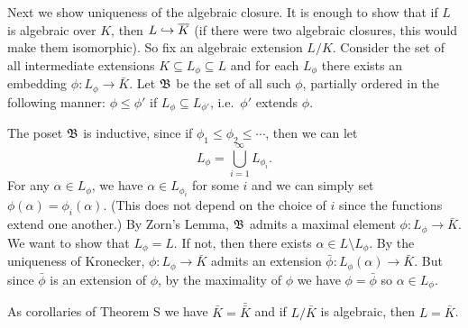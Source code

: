 Next we show uniqueness of the algebraic closure. It is enough to show that if $L$ is algebraic over $K$, then $L\hookrightarrow \overline K$ (if there were two algebraic closures, this would make them isomorphic). So fix an algebraic extension $L/K$. Consider the set of all intermediate extensions $K\subseteq L_\phi\subseteq L$ and for each $L_\phi$ there exists an embedding $\phi : L_\phi \to \bar K$. Let $\frak B$ be the set of all such $\phi$, partially ordered in the following manner: $\phi \leq \phi'$ if $L_\phi \subseteq L_{\phi'}$, i.e.\ $\phi'$ extends $\phi$.

The poset $\frak B$ is inductive, since if $\phi_1 \leq \phi_2 \leq \cdots$, then we can let
$$L_\phi = \bigcup_{i=1}^\infty L_{\phi_i}.$$
For any $\alpha\in L_\phi$, we have $\alpha\in L_{\phi_i}$ for some $i$ and we can simply set $\phi(\alpha) = \phi_i(\alpha)$. (This does not depend on the choice of $i$ since the functions extend one another.) By Zorn's Lemma, $\frak B$ admits a maximal element $\phi : L_\phi \to \bar K$. We want to show that $L_\phi = L$. If not, then there exists $\alpha\in L\setminus L_\phi$. By the uniqueness of Kronecker, $\phi: L_\phi \to \bar K$ admits an extension $\bar\phi : L_\phi(\alpha) \to \bar K$. But since $\bar \phi$ is an extension of $\phi$, by the maximality of $\phi$ we have $\phi= \bar\phi$ so $\alpha\in L_\phi$.\slug

As corollaries of Theorem S we have $\bar K = \bar{\bar K}$ and if $L/\bar K$ is algebraic, then $L = \bar K$.



\bye
